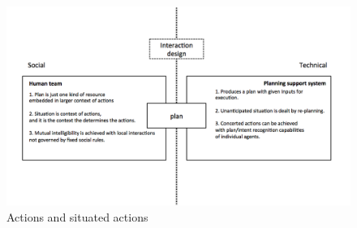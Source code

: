 \begin{figure}[h]
  \centering
  \includegraphics[width=1\textwidth]{img/approach/gap}
  \caption{Actions and situated actions}
  \label{fig:gap}
\end{figure}





